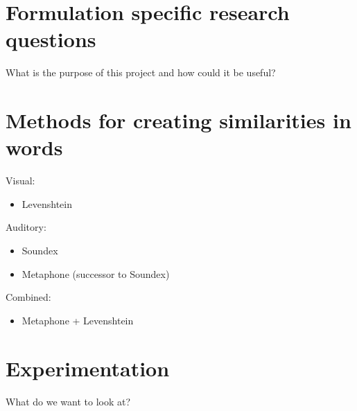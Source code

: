 \section{Formulation specific research questions}
What is the purpose of this project and how could it be useful?

\newpage
\section{Methods for creating similarities in words}

Visual: 
\begin{itemize}
    \item Levenshtein 
\end{itemize}

Auditory:
\begin{itemize}
    \item Soundex
    \item Metaphone (successor to Soundex)
\end{itemize}

Combined:
\begin{itemize}
    \item Metaphone + Levenshtein
\end{itemize}

\section{Experimentation}
What do we want to look at?



